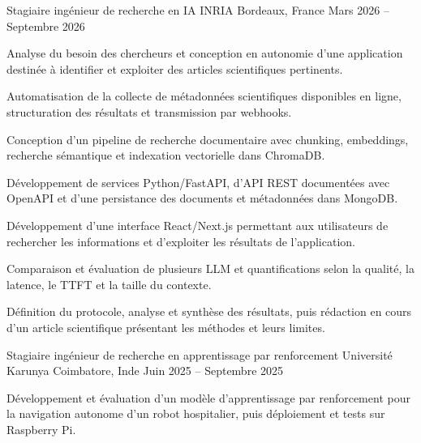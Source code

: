 
\begin{cventries}
  \cventry
    {Stagiaire ingénieur de recherche en IA}
    {INRIA}
    {Bordeaux, France}
    {Mars 2026 -- Septembre 2026}
    {
      \begin{cvitems}
        \item {Analyse du besoin des chercheurs et conception en autonomie d’une application destinée à identifier et exploiter des articles scientifiques pertinents.}
        \item {Automatisation de la collecte de métadonnées scientifiques disponibles en ligne, structuration des résultats et transmission par webhooks.}
        \item {Conception d’un pipeline de recherche documentaire avec chunking, embeddings, recherche sémantique et indexation vectorielle dans ChromaDB.}
        \item {Développement de services Python/FastAPI, d’API REST documentées avec OpenAPI et d’une persistance des documents et métadonnées dans MongoDB.}
        \item {Développement d’une interface React/Next.js permettant aux utilisateurs de rechercher les informations et d’exploiter les résultats de l’application.}
        \item {Comparaison et évaluation de plusieurs LLM et quantifications selon la qualité, la latence, le TTFT et la taille du contexte.}
        \item {Définition du protocole, analyse et synthèse des résultats, puis rédaction en cours d’un article scientifique présentant les méthodes et leurs limites.}
      \end{cvitems}
    }

  \cventry
    {Stagiaire ingénieur de recherche en apprentissage par renforcement}
    {Université Karunya}
    {Coimbatore, Inde}
    {Juin 2025 -- Septembre 2025}
    {
      \begin{cvitems}
        \item {Développement et évaluation d’un modèle d’apprentissage par renforcement pour la navigation autonome d’un robot hospitalier, puis déploiement et tests sur Raspberry Pi.}
      \end{cvitems}
    }
\end{cventries}
